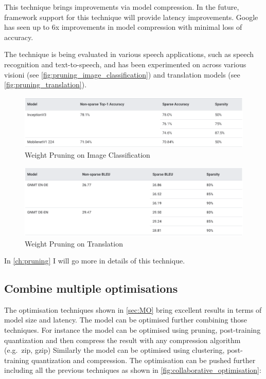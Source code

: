 This technique brings improvements via model compression. In the future,
framework support for this technique will provide latency improvements.
Google has seen up to 6x improvements in model compression with minimal loss of
accuracy.

The technique is being evaluated in various speech applications, such as speech
recognition and text-to-speech, and has been experimented on across various
visioni (see \autoref{fig:pruning_image_classification}) and translation
models (see \autoref{fig:pruning_translation}).~\cite{tfmot:pruning}

\begin{figure}[ht]
    \includegraphics[width=\textwidth]{images/introduction/pruning_image_classification.png}
    \centering
    \caption{Weight Pruning on Image Classification}\label{fig:pruning_image_classification}
\end{figure}

\begin{figure}[ht]
    \includegraphics[width=\textwidth]{images/introduction/pruning_translation.png}
    \centering
    \caption{Weight Pruning on Translation}\label{fig:pruning_translation}
\end{figure}

In \autoref{ch:pruning} I will go more in details of this technique.

\subsection{Combine multiple optimisations}
The optimisation techniques shown in \autoref{sec:MO} bring excellent results
in terms of model size and latency.
The model can be optimised further combining those techniques. For instance the
model can be optimised using pruning, post-training quantization and then
compress the result with any compression algorithm (e.g.\ zip, gzip)
Similarly the model can be optimised using clustering, post-training
quantization and compression.
The optimisation can be pushed further including all the previous techniques as
shown in \autoref{fig:collaborative_optimisation}:

